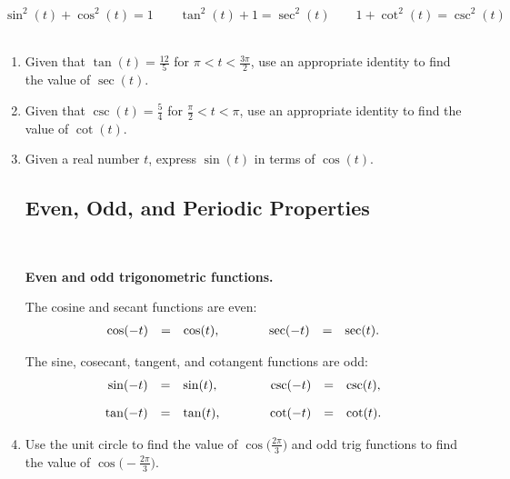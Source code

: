 $$\sin^2(t)+\cos^2(t)=1 \quad \quad \tan^2(t)+1=\sec^2(t) \quad \quad 1+\cot^2(t)=\csc^2(t)$$
\\
\begin{enumerate}
\item Given that $\tan(t)=\frac{12}{5}$ for $\pi < t < \frac{3\pi}{2}$, use an appropriate identity to find the value of $\sec(t)$.\\[2in]

\item Given that $\csc(t)=\frac{5}{4}$ for $\frac{\pi}{2} < t < \pi$, use an appropriate identity to find the value of $\cot(t)$.\\[2in]

\item Given a real number $t$, express $\sin(t)$ in terms of $\cos(t)$.\\[1.5in]

\newpage

\subsection{Even, Odd, and Periodic Properties} ~

   \noindent\colorbox{blue!10}{%
   \parbox{\dimexpr\linewidth}%
   {%
     \textbf{Even and odd trigonometric functions.}

     The cosine and secant functions are even:
     \begin{eqnarray*}
       \begin{array}{rcl@{\hspace{4em}}rcl}
         \cos(-t) & = & \cos(t), & \sec(-t) & = & \sec(t).
       \end{array}
     \end{eqnarray*}

     The sine, cosecant, tangent, and cotangent functions are odd:
     \begin{eqnarray*}
       \begin{array}{rcl@{\hspace{4em}}rcl}
         \sin(-t) & = & \sin(t), & \csc(-t) & = & \csc(t),\\ [10pt]
         \tan(-t) & = & \tan(t), & \cot(-t) & = & \cot(t).
       \end{array}
     \end{eqnarray*}

   }
 }


\item Use the unit circle to find the value of $\displaystyle \cos \Bigg(\frac{2\pi}{3}\Bigg)$ and odd trig functions to find the value of $\displaystyle \cos \Bigg(-\frac{2\pi}{3}\Bigg)$.


\end{enumerate}
